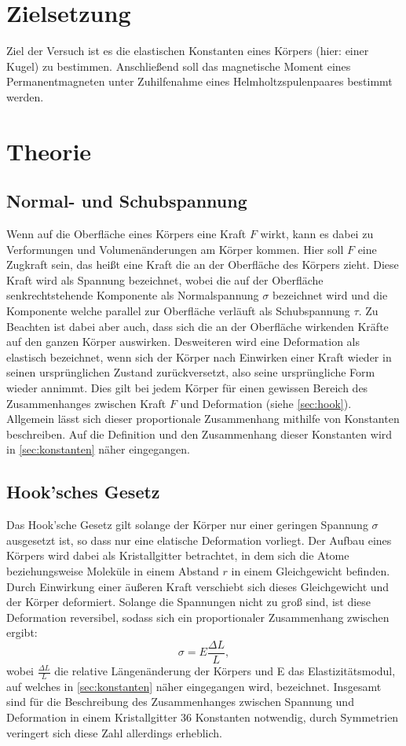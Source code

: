 \section{Zielsetzung}
Ziel der Versuch ist es die elastischen Konstanten eines Körpers (hier: einer Kugel) zu bestimmen. Anschließend soll das magnetische
Moment eines Permanentmagneten unter Zuhilfenahme eines Helmholtzspulenpaares bestimmt werden.
\section{Theorie}
\label{sec:Theorie}
    \subsection{Normal- und Schubspannung}
    Wenn auf die Oberfläche eines Körpers eine Kraft $F$ wirkt, kann es dabei zu Verformungen und Volumenänderungen am Körper
    kommen. Hier soll $F$ eine Zugkraft sein, das heißt eine Kraft die an der Oberfläche des Körpers zieht. Diese Kraft wird
    als Spannung bezeichnet, wobei die auf der Oberfläche senkrechtstehende Komponente als Normalspannung $\sigma$ bezeichnet wird
    und die Komponente welche parallel zur Oberfläche verläuft als Schubspannung $\tau$.
    Zu Beachten ist dabei aber auch, dass sich die an der Oberfläche wirkenden Kräfte auf den ganzen Körper auswirken.
    Desweiteren wird eine Deformation als elastisch bezeichnet, wenn sich der Körper nach Einwirken einer Kraft wieder in seinen
    ursprünglichen Zustand zurückversetzt, also seine ursprüngliche Form wieder annimmt. Dies gilt bei jedem Körper für einen 
    gewissen Bereich des Zusammenhanges zwischen Kraft $F$ und Deformation (siehe \autoref{sec:hook}). Allgemein lässt sich dieser 
    proportionale Zusammenhang mithilfe von Konstanten beschreiben. Auf die Definition und den Zusammenhang dieser Konstanten wird 
    in \autoref{sec:konstanten} näher eingegangen.
    \subsection{Hook'sches Gesetz}
    \label{sec:hook}
    Das Hook'sche Gesetz gilt solange der Körper nur einer geringen Spannung $\sigma$ ausgesetzt ist, so dass nur eine elatische 
    Deformation vorliegt. Der Aufbau eines Körpers wird dabei
    als Kristallgitter betrachtet, in dem sich die Atome beziehungsweise Moleküle in einem Abstand $r$ in einem 
    Gleichgewicht befinden. Durch Einwirkung einer äußeren Kraft verschiebt sich dieses Gleichgewicht und der Körper deformiert.
    Solange die Spannungen nicht zu groß sind, ist diese Deformation reversibel, sodass sich ein proportionaler Zusammenhang zwischen
    ergibt:
    \begin{equation}
    \label{eqn:hook}
        \sigma = E \frac {\Delta L} {L},
    \end{equation}     
    wobei $\frac {\Delta L}{L}$ die relative Längenänderung der Körpers und E das Elastizitätsmodul, auf welches in \autoref{sec:konstanten}
    näher eingegangen wird, bezeichnet.
    Insgesamt sind für die Beschreibung des Zusammenhanges zwischen Spannung und Deformation in einem Kristallgitter 36 Konstanten
    notwendig, durch Symmetrien veringert sich diese Zahl allerdings erheblich. 

